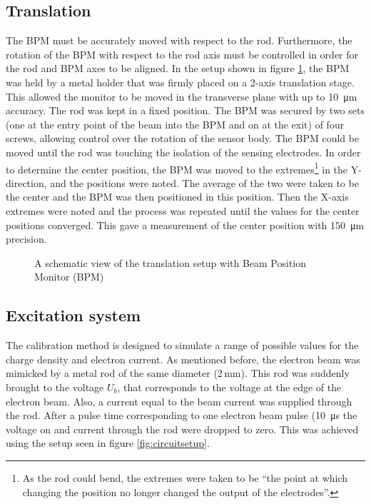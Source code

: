 \subsection{Translation}
\label{sec:calibration/translation}
The BPM must be accurately moved with respect to the rod. Furthermore, the rotation of the BPM with respect to the rod axis must be controlled in order for the rod and BPM axes to be aligned.
In the setup shown in figure \ref{fig:schem_translation}, the BPM was held by a metal holder that was firmly placed on a 2-axis translation stage. This allowed the monitor to be moved in the transverse plane with up to \SI{10}{\micro\meter} accuracy. The rod was kept in a fixed position.
The BPM was secured by two sets (one at the entry point of the beam into the BPM and on at the exit) of four screws, allowing control over the rotation of the sensor body. The BPM could be moved until the rod was touching the isolation of the sensing electrodes. 
In order to determine the center position, the BPM was moved to the extremes\footnote{As the rod could bend, the extremes were taken to be ``the point at which changing the position no longer changed the output of the electrodes''.} in the Y-direction, and the positions were noted. The average of the two were taken to be the center and the BPM was then positioned in this position. Then the X-axis extremes were noted and the process was repeated until the values for the center positions converged. This gave a measurement of the center position with \SI{150}{\micro\meter} precision.
\begin{figure}[H]
\centering

\caption{A schematic view of the translation setup with Beam Position Monitor (BPM)}
\label{fig:schem_translation}
\end{figure}

\subsection{Excitation system}
The calibration method is designed to simulate a range of possible values for the charge density and electron current. 
As mentioned before, the electron beam was mimicked by a metal rod of the same diameter (2\,mm). This rod was suddenly brought to the voltage $U_b$, that corresponds to the voltage at the edge of the electron beam. Also, a current equal to the beam current was supplied through the rod.
After a pulse time corresponding to one electron beam pulse (\SI{10}{\micro\second} the voltage on and current through the rod were dropped to zero. This was achieved using the setup seen in figure \ref{fig:circuitsetup}.

